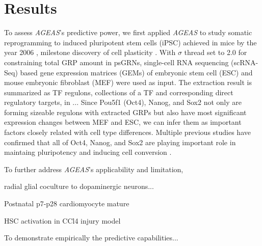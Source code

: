 \documentclass[fleqn,10pt]{wlscirep}
\begin{document}
\section*{Results}
  \label{res}
  To assess \emph{AGEAS}'s predictive power, we first applied \emph{AGEAS} to study somatic reprogramming to induced pluripotent stem cells (iPSC) achieved in mice by
  the year 2006 \cite{yamanaka_2006}, milestone discovery of cell plasticity \cite{cell_repro_review}.
  With $\sigma$ thread set to 2.0 for constraining total GRP amount in psGRNs, single-cell RNA sequencing (scRNA-Seq) based gene expression matrices (GEMs) of embryonic stem cell (ESC) and mouse embryonic fibroblast (MEF) were used as input.
  The extraction result is summarized as TF regulons, collections of a TF and corresponding direct regulatory targets, in ... %
  Since Pou5f1 (Oct4), Nanog, and Sox2 not only are forming sizeable regulons with extracted GRPs but also have most significant expression changes between MEF and ESC, we can infer them as important factors closely related with cell type differences.
  Multiple previous studies have confirmed that all of Oct4, Nanog, and Sox2 are playing important role in maintaing pluripotency \cite{niwa_2007} and inducing cell conversion \cite{yamanaka_2006, ips7f, ipsOK, oct4_nanog_sox2_lin28, oct4_nanog_sox2}.

  To further address \emph{AGEAS}'s applicability and limitation,

  radial glial coculture to dopaminergic neurons...
  
  Postnatal p7-p28 cardiomyocyte mature

  HSC activation in CCl4 injury model

  To demonstrate empirically the predictive capabilities...
\end{document}
